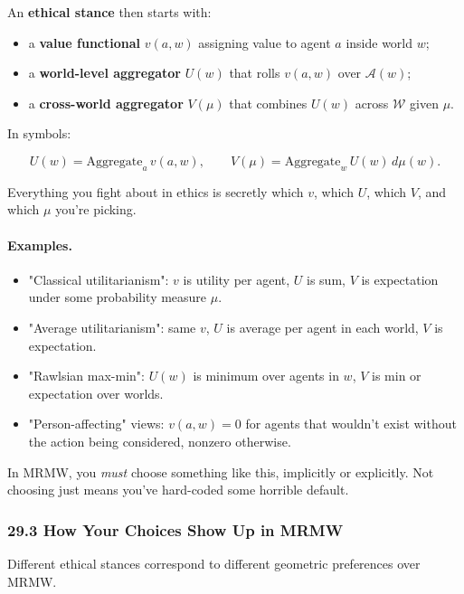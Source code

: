 An \textbf{ethical stance} then starts with:

\begin{itemize}
  \item a \textbf{value functional} $v(a,w)$ assigning value to agent $a$ inside world $w$;
  \item a \textbf{world-level aggregator} $U(w)$ that rolls $v(a,w)$ over $\mathcal{A}(w)$;
  \item a \textbf{cross-world aggregator} $V(\mu)$ that combines $U(w)$ across $\mathcal{W}$ given $\mu$.
\end{itemize}

In symbols:

\[
  U(w) = \text{Aggregate}_a \, v(a,w),
  \qquad
  V(\mu) = \text{Aggregate}_w \, U(w) \, d\mu(w).
\]

Everything you fight about in ethics is secretly which $v$, which $U$, which $V$, and which $\mu$ you’re picking.

\paragraph{Examples.}

\begin{itemize}
  \item "Classical utilitarianism": $v$ is utility per agent, $U$ is sum, $V$ is expectation under some probability measure $\mu$.

  \item "Average utilitarianism": same $v$, $U$ is average per agent in each world, $V$ is expectation.

  \item "Rawlsian max-min": $U(w)$ is minimum over agents in $w$, $V$ is min or expectation over worlds.

  \item "Person-affecting" views: $v(a,w)=0$ for agents that wouldn’t exist without the action being considered, nonzero otherwise.
\end{itemize}

In MRMW, you \emph{must} choose something like this, implicitly or explicitly.
Not choosing just means you’ve hard-coded some horrible default.

\subsubsection*{29.3  How Your Choices Show Up in MRMW}

Different ethical stances correspond to different geometric preferences over MRMW.

